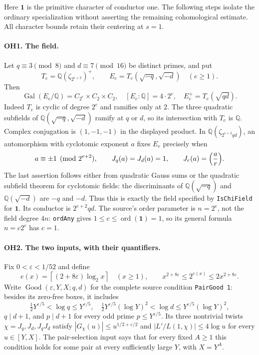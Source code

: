 \documentclass[11pt,a4paper]{article}
\numberwithin{equation}{section}
\theoremstyle{remark}\newtheorem{remark}[theorem]{Remark}
\begin{document}
Here $\mathbf1$ is the primitive character of conductor one.  The following
steps isolate the ordinary specialization without asserting the remaining
cohomological estimate.  All character bounds retain their centering at $s=1$.

\paragraph{OH1. The field.}
Let $q\equiv3\pmod8$ and $d\equiv7\pmod{16}$ be distinct primes, and put
\[
 T_e=\mathbb Q(\zeta_{2^{e+2}})^+,
 \qquad E_e=T_e(\sqrt{-q},\sqrt{-d})\quad(e\ge1).
\]
Then
\[
 \operatorname{Gal}(E_e/\mathbb Q)=C_{2^e}\times C_2\times C_2,
 \quad [E_e:\mathbb Q]=4\cdot2^e,
 \quad E_e^+=T_e(\sqrt{qd}).
\]
Indeed $T_e$ is cyclic of degree $2^e$ and ramifies only at $2$.
The three quadratic subfields of
$\mathbb Q(\sqrt{-q},\sqrt{-d})$ ramify at $q$ or $d$, so its intersection
with $T_e$ is $\mathbb Q$.  Complex conjugation is $(1,-1,-1)$ in the
displayed product.  In $\mathbb Q(\zeta_{2^{e+2}qd})$, an automorphism with
cyclotomic exponent $a$ fixes $E_e$ precisely when
\[
 a\equiv\pm1\pmod{2^{e+2}},\qquad
 J_q(a)=J_d(a)=1,\qquad J_r(a)=\Bigl(\frac ar\Bigr).
\]
The last assertion follows either from quadratic Gauss sums or the quadratic
subfield theorem for cyclotomic fields: the discriminants of
$\mathbb Q(\sqrt{-q})$ and $\mathbb Q(\sqrt{-d})$ are $-q$ and $-d$.
Thus this is exactly the field specified by \texttt{IsChiField} for
$\mathbf1$.  Its conductor is $2^{e+2}qd$.
The source's order parameter is $n=2^e$, not the field degree $4n$:
\texttt{ordAny} gives $1\le c\le\operatorname{ord}(\mathbf1)=1$, so its
general formula $n=c2^e$ has $c=1$.

\paragraph{OH2. The two inputs, with their quantifiers.}
Fix $0<\varepsilon<1/52$ and define
\[
 e(x)=\left\lceil(2+8\varepsilon)\log_2x\right\rceil\quad(x\ge1),
 \qquad x^{2+8\varepsilon}\le2^{e(x)}\le2x^{2+8\varepsilon}.
\]
Write $\operatorname{Good}(\varepsilon,Y,X;q,d)$ for the complete source
condition \texttt{PairGood 1}: besides its zero-free boxes, it includes
\[
 \tfrac12Y^{\varepsilon/5}<\log q\le Y^{\varepsilon/5},\quad
 \tfrac12Y^{\varepsilon/5}(\log Y)^2<\log d
       \le Y^{\varepsilon/5}(\log Y)^2,
\]
$q\mid d+1$, and $p\mid d+1$ for every odd prime $p\le Y^{\varepsilon/5}$.
Its three nontrivial twists $\chi=J_q,J_d,J_qJ_d$ satisfy
$|G_\chi(u)|\le u^{1/2+\varepsilon/2}$ and
$|L'/L(1,\chi)|\le4\log u$ for every $u\in[Y,X]$.
The pair-selection input says that for every fixed $A\ge1$ this condition
holds for some pair at every sufficiently large $Y$, with $X=Y^A$.
\end{document}
